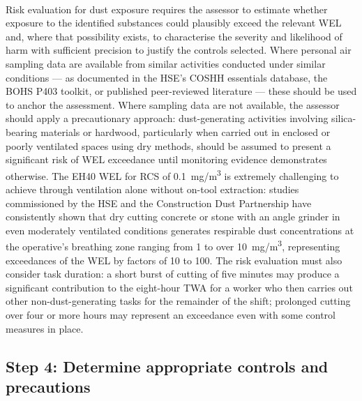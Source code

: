 \paragraph{}
Risk evaluation for dust exposure requires the assessor to estimate whether exposure to the identified substances could plausibly exceed the relevant WEL and, where that possibility exists, to characterise the severity and likelihood of harm with sufficient precision to justify the controls selected. Where personal air sampling data are available from similar activities conducted under similar conditions --- as documented in the HSE's COSHH essentials database, the BOHS P403 toolkit, or published peer-reviewed literature --- these should be used to anchor the assessment. Where sampling data are not available, the assessor should apply a precautionary approach: dust-generating activities involving silica-bearing materials or hardwood, particularly when carried out in enclosed or poorly ventilated spaces using dry methods, should be assumed to present a significant risk of WEL exceedance until monitoring evidence demonstrates otherwise. The EH40 WEL for RCS of 0.1~mg/m\textsuperscript{3} is extremely challenging to achieve through ventilation alone without on-tool extraction: studies commissioned by the HSE and the Construction Dust Partnership have consistently shown that dry cutting concrete or stone with an angle grinder in even moderately ventilated conditions generates respirable dust concentrations at the operative's breathing zone ranging from 1 to over 10~mg/m\textsuperscript{3}, representing exceedances of the WEL by factors of 10 to 100. The risk evaluation must also consider task duration: a short burst of cutting of five minutes may produce a significant contribution to the eight-hour TWA for a worker who then carries out other non-dust-generating tasks for the remainder of the shift; prolonged cutting over four or more hours may represent an exceedance even with some control measures in place.

\subsection{Step 4: Determine appropriate controls and precautions}

